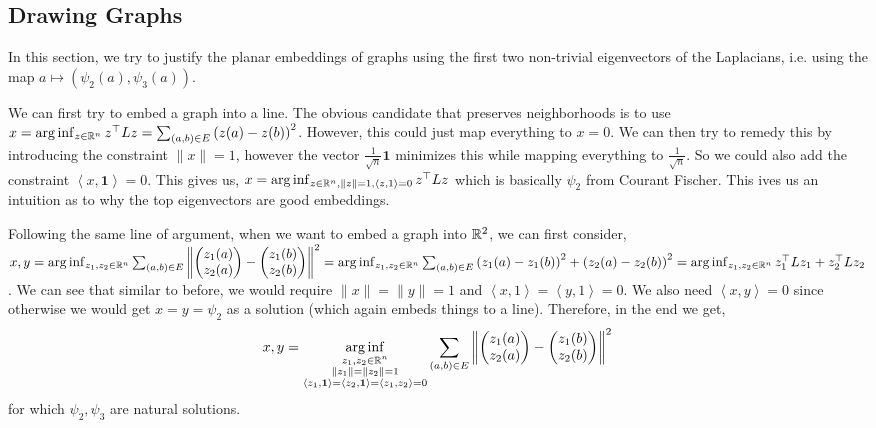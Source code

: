 \documentclass[11pt,letterpaper]{article}
\newcommand{\vOne}{\mathbf{1}}
\newcommand{\dpro}[1]{\left \langle #1 \right \rangle}
\begin{document}
\subsection{Drawing Graphs}

In this section, we try to justify the planar embeddings of graphs using the first two non-trivial eigenvectors of the Laplacians, i.e. using the map $a \mapsto \left(\psi_2(a),\psi_3(a)\right)$.

We can first try to embed a graph into a line. The obvious candidate that preserves neighborhoods is to use $x = \arg \inf_{z \in \mathbb{R}^n} z^\top Lz = \sum_{(a,b) \in E} \left(z(a)-z(b)\right)^2$. However, this could just map everything to $x=0$. We can then try to remedy this by introducing the constraint $\|x\|=1$, however the vector $\frac{1}{\sqrt{n}}\vOne$ minimizes this while mapping everything to $\frac{1}{\sqrt{n}}$. So we could also add the constraint $\dpro{x,\vOne} = 0$. This gives us, $x = \arg \inf_{z \in \R^n, \|z\|=1, \dpro{z,1}=0} z^\top Lz$ which is basically $\psi_2$ from Courant Fischer. This ives us an intuition as to why the top eigenvectors are good embeddings.

Following the same line of argument, when we want to embed a graph into $\mathbb{R}^2$, we can first consider, $x,y = \arg \inf_{z_1,z_2 \in \mathbb{R}^n} \sum_{(a,b) \in E}\left \|\begin{pmatrix}z_1(a) \\ z_2(a)\end{pmatrix}-\begin{pmatrix}z_1(b) \\ z_2(b)\end{pmatrix}\right\|^2 = \arg \inf_{z_1,z_2 \in \mathbb{R}^n} \sum_{(a,b) \in E} \left(z_1(a)-z_1(b)\right)^2+\left(z_2(a)-z_2(b)\right)^2 = \arg \inf_{z_1,z_2 \in \mathbb{R}^n} z_1^\top L z_1 + z_2^\top L z_2$. We can see that similar to before, we would require $\|x\|=\|y\|=1$ and $\dpro{x,1} = \dpro{y,1} = 0$. We also need $\dpro{x,y}=0$ since otherwise we would get $x=y= \psi_2$ as a solution (which again embeds things to a line). Therefore, in the end we get,
\begin{align*}
x,y =  \underset{\substack{z_1,z_2 \in \R^n \\ \|z_1\|=\|z_2\|=1 \\ \dpro{z_1,\vOne}=\dpro{z_2,\vOne}=\dpro{z_1,z_2}=0}}{\arg \inf} \sum_{(a,b) \in E}\left \|\begin{pmatrix}z_1(a) \\ z_2(a)\end{pmatrix}-\begin{pmatrix}z_1(b) \\ z_2(b)\end{pmatrix}\right\|^2
\end{align*}
for which $\psi_2,\psi_3$ are natural solutions.
\end{document}
